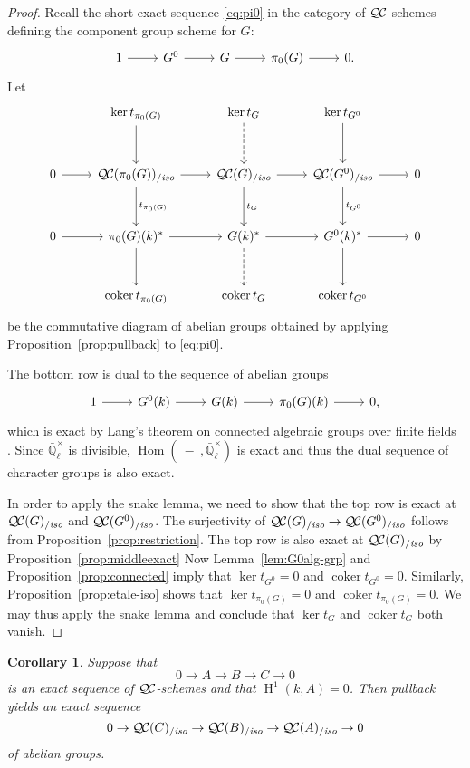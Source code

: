 \documentclass[11pt]{amsart}
\theoremstyle{plain}
\newtheorem{corollary}[theorem]{Corollary}
\theoremstyle{definition}
\theoremstyle{remark}
\newcommand{\EE}{\mathbb{\bar Q}_\ell}
\newcommand{\Fq}{k}
\newcommand{\EEx}{\EE^\times}
\DeclareMathOperator{\Hom}{Hom}
\DeclareMathOperator{\coker}{coker}
\DeclareMathOperator{\Hh}{H}
\newcommand{\QC}{{\mathcal{Q\hskip-0.8pt C}}}
\newcommand{\QCiso}[1]{\QC(#1)_{/\textit{iso}}}
\newcommand{\trFrob}[1]{t_{#1}}
\begin{document}
\begin{proof}
  Recall the short exact sequence \eqref{eq:pi0} in the category of $\QC$-schemes
  defining the component group scheme for $G$:
  \[
  \begin{tikzcd}
    1 \rar & G^0 \rar & G \rar & \pi_0(G) \rar & 0.
  \end{tikzcd}
  \]
  Let
  \[
  \begin{tikzcd}[row sep=30]
    {}& \ker \trFrob{\pi_0(G)} \dar & \arrow[dashed]{d} \ker \trFrob{G} & \ker \trFrob{G^0} \dar & \\
    0 \rar & \QCiso{\pi_0(G)} \rar \dar{\trFrob{\pi_0(G)}}
    & \QCiso{G} \rar \dar{\trFrob{G}} & \QCiso{G^0} \rar \dar{\trFrob{G^0}} & 0\\
    0 \rar & \pi_0(G)(\Fq)^* \rar \dar
    & \arrow[dashed]{d} G(\Fq)^* \rar & G^0(\Fq)^* \rar \dar & 0\\
    & \coker \trFrob{\pi_0(G)} & \coker \trFrob{G} &  \coker \trFrob{G^0} &
  \end{tikzcd}
  \]
  be the commutative diagram of abelian groups obtained by applying
  Proposition~\ref{prop:pullback} to \eqref{eq:pi0}. 
  
  The bottom row is dual to the sequence of
  abelian groups
  \begin{equation}\label{eq:pi0k}
  \begin{tikzcd}
    1 \rar & G^0(\Fq) \rar & G(\Fq) \rar & \pi_0(G)(\Fq) \rar & 0,
  \end{tikzcd}
  \end{equation}
  which is exact by Lang's theorem on connected algebraic groups over finite fields \cite{lang:56a}.
  Since $\EEx$ is divisible, $\Hom(\ - \ ,\EEx)$ is exact and thus the dual sequence of
  character groups is also exact.
  
  In order to apply the snake lemma, we need to show that the top row is exact at $\QCiso{G}$ and $\QCiso{G^0}$.
  The surjectivity of $\QCiso{G} \to \QCiso{G^0}$ follows from Proposition~\ref{prop:restriction}.  The top row is also exact at $\QCiso{G}$ by Proposition~\ref{prop:middleexact}
%  
  Now Lemma~\ref{lem:G0alg-grp} and Proposition~\ref{prop:connected}
  imply that $\ker \trFrob{G^0} =0$ and $\coker \trFrob{G^0}=0$. 
  Similarly, Proposition~\ref{prop:etale-iso} shows that $\ker \trFrob{\pi_0(G)}=0$
  and $\coker \trFrob{\pi_0(G)}=0$.
  We may thus apply the snake lemma and conclude that
  $\ker \trFrob{G}$ and $\coker \trFrob{G}$ both vanish.
\end{proof}

\begin{corollary}
Suppose that
\[
0 \to A \to B \to C \to 0
\]
is an exact sequence of $\QC$-schemes and that $\Hh^1(\Fq, A) = 0$.  Then pullback yields an exact sequence
\[
0 \to \QCiso{C} \to \QCiso{B} \to \QCiso{A} \to 0
\]
of abelian groups.
\end{corollary}
\end{document}
